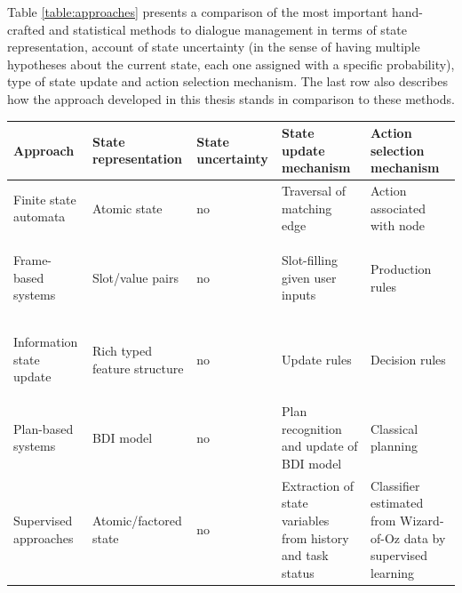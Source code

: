 Table \ref{table:approaches} presents a comparison of the most important hand-crafted and statistical methods to dialogue management in terms of state representation, account of state uncertainty (in the sense of having multiple hypotheses about the current state, each one assigned with a specific probability), type of state update and action selection mechanism.  The last row also describes how the approach developed in this thesis stands in comparison to these methods. 
  
\renewcommand{\arraystretch}{2.0}
\setlength{\tabcolsep}{8pt}
\begin{table}
\begin{center}
\begin{tabular}{|p{55mm}||p{31mm}|p{16mm}|p{50mm}|p{66mm}|} \hline
\centering \textbf{Approach} &  \centering \textbf{State representation} &  \centering \textbf{State uncertainty} &  \centering \textbf{State update mechanism} & \textbf{Action selection mechanism} \vspace{5pt} \\  \hline \hline
Finite state automata & Atomic state & no & Traversal of matching edge & Action associated with node \vspace{5pt} \\ \hline
Frame-based systems \; \; \; \; \; \; \; \; \; \; \; \; \begin{footnotesize}\citep[e.g.][]{seneff2000}\end{footnotesize}& Slot/value pairs & no & Slot-filling given user inputs & Production rules \vspace{5pt} \\ \hline
Information state update \; \; \; \; \; \; \begin{footnotesize}\citep[e.g.][]{Larsson:2000}\end{footnotesize} & Rich typed feature structure \vspace{5pt} & no & Update rules & Decision rules \vspace{5pt} \\ \hline
Plan-based systems   \; \;  \; \; \; \; \; \; \; \; \begin{footnotesize}\citep[e.g.][]{Freedman:2000,Allen:2001}\end{footnotesize} & BDI model \vspace{5pt} & no & Plan recognition and update of BDI model & Classical planning \vspace{5pt} \\ \hline
Supervised approaches \; \; \; \; \; \; \; \; \begin{footnotesize}\citep[e.g.][]{Hurtado:2005}\end{footnotesize} & Atomic/factored state & no & Extraction of state variables from history and task status & Classifier estimated from Wizard-of-Oz data by supervised learning\vspace{5pt} \\ \hline

\end{tabular}
\end{center}
\end{table}
